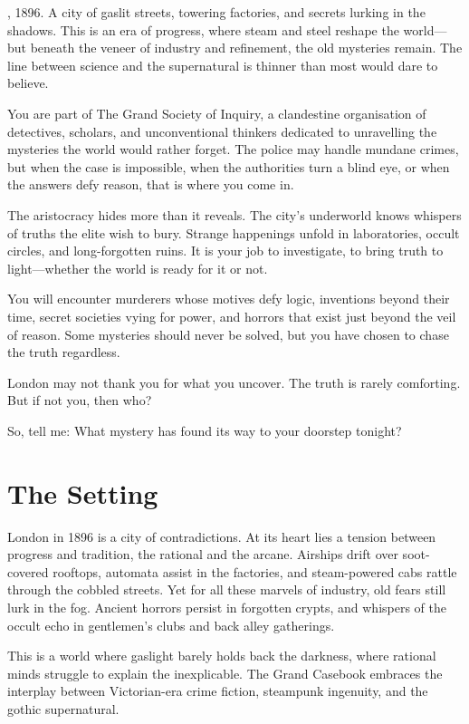 
\begin{WyrdSettingHeading}
    , 1896. A city of gaslit streets, towering factories, and secrets lurking in the shadows. This is an era of progress, where steam and steel reshape the world—but beneath the veneer of industry and refinement, the old mysteries remain. The line between science and the supernatural is thinner than most would dare to believe.

    You are part of The Grand Society of Inquiry, a clandestine organisation of detectives, scholars, and unconventional thinkers dedicated to unravelling the mysteries the world would rather forget. The police may handle mundane crimes, but when the case is impossible, when the authorities turn a blind eye, or when the answers defy reason, that is where you come in.

    The aristocracy hides more than it reveals. The city's underworld knows whispers of truths the elite wish to bury. Strange happenings unfold in laboratories, occult circles, and long-forgotten ruins. It is your job to investigate, to bring truth to light—whether the world is ready for it or not.

    You will encounter murderers whose motives defy logic, inventions beyond their time, secret societies vying for power, and horrors that exist just beyond the veil of reason. Some mysteries should never be solved, but you have chosen to chase the truth regardless.

    London may not thank you for what you uncover. The truth is rarely comforting. But if not you, then who?

    So, tell me: What mystery has found its way to your doorstep tonight?
\end{WyrdSettingHeading}

\section{The Setting}

London in 1896 is a city of contradictions. At its heart lies a tension between progress and tradition, the rational and the arcane. Airships drift over soot-covered rooftops, automata assist in the factories, and steam-powered cabs rattle through the cobbled streets. Yet for all these marvels of industry, old fears still lurk in the fog. Ancient horrors persist in forgotten crypts, and whispers of the occult echo in gentlemen’s clubs and back alley gatherings.

This is a world where gaslight barely holds back the darkness, where rational minds struggle to explain the inexplicable. The Grand Casebook embraces the interplay between Victorian-era crime fiction, steampunk ingenuity, and the gothic supernatural.

